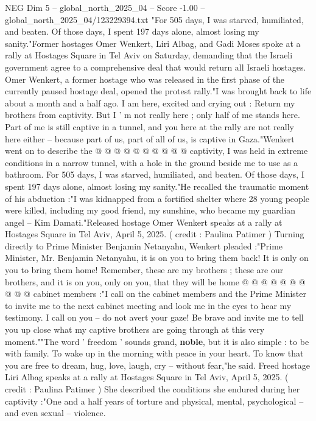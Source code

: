 \begin{textsample}{NEG Dim 5 – global\_north\_2025\_04 – Score -1.00 – global\_north\_2025\_04/123229394.txt}  \label{ex:f5_neg_364}
"For 505 days, I was starved, humiliated, and beaten.
Of those days, I spent 197 days alone, almost losing my sanity."Former hostages Omer Wenkert, Liri Albag, and Gadi Moses spoke at a rally at Hostages Square in Tel Aviv on Saturday, demanding that the Israeli government agree to a comprehensive deal that would return all Israeli hostages.
Omer Wenkert, a former hostage who was released in the first phase of the currently paused hostage deal, opened the protest rally."I was brought back to life about a month and a half ago.
I am here, excited and crying out : Return my brothers from captivity.
But I ' m not really here ; only half of me stands here.
Part of me is still captive in a tunnel, and you here at the rally are not really here either -- because part of us, part of all of us, is captive in Gaza."Wenkert went on to describe the @ @ @ @ @ @ @ @ @ @ captivity, I was held in extreme conditions in a narrow tunnel, with a hole in the ground beside me to use as a bathroom.
For 505 days, I was starved, humiliated, and beaten.
Of those days, I spent 197 days alone, almost losing my sanity."He recalled the traumatic moment of his abduction :"I was kidnapped from a fortified shelter where 28 young people were killed, including my good friend, my sunshine, who became my guardian angel -- Kim Damati."Released hostage Omer Wenkert speaks at a rally at Hostages Square in Tel Aviv, April 5, 2025. ( credit : Paulina Patimer ) Turning directly to Prime Minister Benjamin Netanyahu, Wenkert pleaded :"Prime Minister, Mr.
Benjamin Netanyahu, it is on you to bring them back!
It is only on you to bring them home!
Remember, these are my brothers ; these are our brothers, and it is on you, only on you, that they will be home @ @ @ @ @ @ @ @ @ @ cabinet members :"I call on the cabinet members and the Prime Minister to invite me to the next cabinet meeting and look me in the eyes to hear my testimony.
I call on you -- do not avert your gaze!
Be brave and invite me to tell you up close what my captive brothers are going through at this very moment.""The word ' freedom ' sounds grand, \textbf{noble}, but it is also simple : to be with family.
To wake up in the morning with peace in your heart.
To know that you are free to dream, hug, love, laugh, cry -- without fear,"he said.
Freed hostage Liri Albag speaks at a rally at Hostages Square in Tel Aviv, April 5, 2025. ( credit : Paulina Patimer ) She described the conditions she endured during her captivity :"One and a half years of torture and physical, mental, psychological -- and even sexual -- violence.

\end{textsample}
